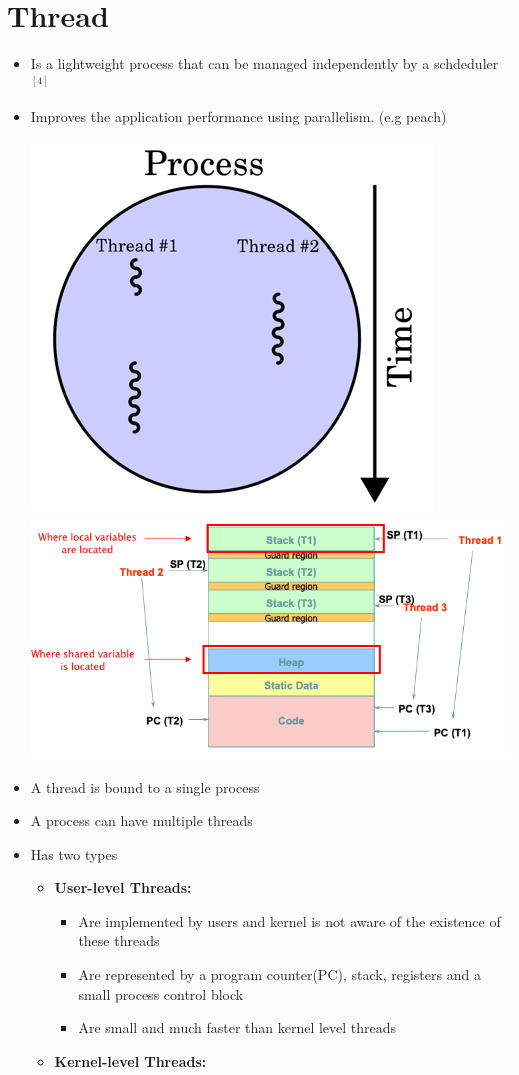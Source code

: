 \documentclass[12pt]{article}
\begin{document}
\section{Thread}

\begin{itemize}
    \item Is a lightweight process that can be managed independently by a schdeduler $^{[4]}$
    \item Improves the application performance using parallelism. (e.g peach)

    \begin{center}
    \includegraphics[width=0.4\linewidth]{images/midterm_2_solution_1.png}
    \includegraphics[width=\linewidth]{images/midterm_2_solution_2.png}
    \end{center}

    \item A thread is bound to a single process
    \item A process can have multiple threads
    \item Has two types
    \begin{itemize}
        \item \textbf{User-level Threads:}

        \begin{itemize}
            \item Are implemented by users and kernel is not aware of the existence of these threads
            \item Are represented by a program counter(PC), stack, registers and a small process control block
            \item Are small and much faster than kernel level threads
        \end{itemize}
        \item \textbf{Kernel-level Threads:}


\end{itemize}
\end{itemize}
\end{document}
